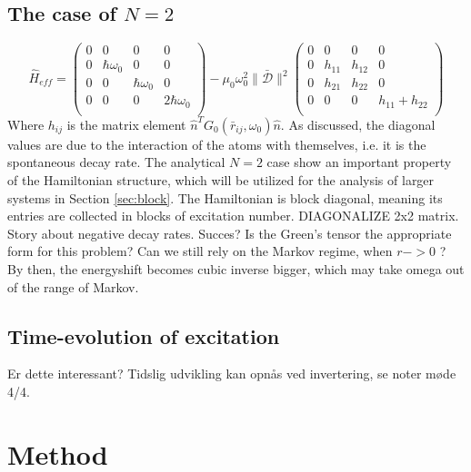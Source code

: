 \documentclass{article}
\begin{document}
\subsection{The case of $N=2$}\label{sec:N2}

\begin{equation}\label{eq:N2_general}
    \hat{H}_{eff} = 
    \begin{pmatrix}
        0 & 0 & 0 & 0 \\
        0 & \hbar \omega_0 & 0 & 0 \\
        0 & 0 & \hbar \omega_0 & 0 \\
        0 & 0 & 0 & 2 \hbar \omega_0 \\
    \end{pmatrix}
    - \mu_0 \omega_0^2 \| \bar{\mathscr{D}} \|^2
    \begin{pmatrix}
        0 & 0 & 0 & 0 \\
        0 & h_{11} & h_{12} & 0 \\
        0 & h_{21} & h_{22} & 0 \\
        0 & 0 & 0 & h_{11} + h_{22} \\
    \end{pmatrix}
\end{equation}
Where $h_{ij}$ is the matrix element $\hat{n}^T G_0(\bar{r}_{ij},\omega_0) \hat{n}$. As discussed, the diagonal values are due to the interaction of the atoms with themselves, i.e. it is the spontaneous decay rate. The analytical $N=2$ case show an important property of the Hamiltonian structure, which will be utilized for the analysis of larger systems in Section \ref{sec:block}. The Hamiltonian is block diagonal, meaning its entries are collected in blocks of excitation number. DIAGONALIZE 2x2 matrix. Story about negative decay rates. Succes? Is the Green's tensor the appropriate form for this problem? Can we still rely on the Markov regime, when $r->0$ ? By then, the energyshift becomes cubic inverse bigger, which may take omega out of the range of Markov.

\subsection{Time-evolution of excitation}

Er dette interessant? Tidslig udvikling kan opnås ved invertering, se noter møde 4/4.

\section{Method}
\end{document}
